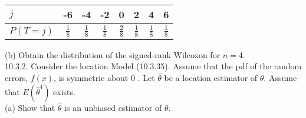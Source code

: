 \begin{center}
\begin{tabular}{|l|ccccccc|}
\hline
$j$ & -6 & -4 & -2 & 0 & 2 & 4 & 6 \\
\hline
$P(T=j)$ & $\frac{1}{8}$ & $\frac{1}{8}$ & $\frac{1}{8}$ & $\frac{2}{8}$ & $\frac{1}{8}$ & $\frac{1}{8}$ & $\frac{1}{8}$ \\
\hline
\end{tabular}
\end{center}

(b) Obtain the distribution of the signed-rank Wilcoxon for $n=4$.\\
10.3.2. Consider the location Model (10.3.35). Assume that the pdf of the random errors, $f(x)$, is symmetric about 0 . Let $\widehat{\theta}$ be a location estimator of $\theta$. Assume that $E\left(\widehat{\theta}^{4}\right)$ exists.\\
(a) Show that $\widehat{\theta}$ is an unbiased estimator of $\theta$.

